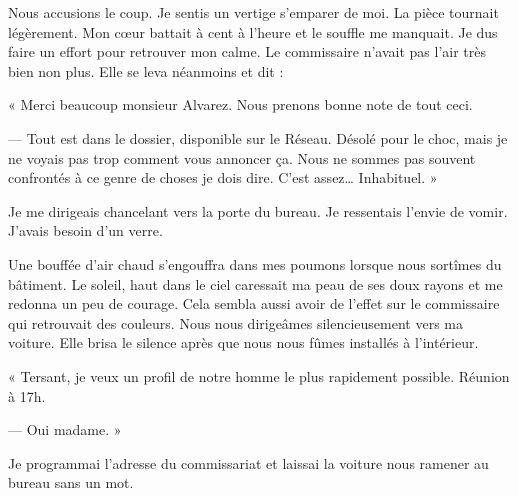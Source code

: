 Nous accusions le coup. Je sentis un vertige s'emparer de moi. La pièce tournait légèrement. Mon cœur battait à cent à 
l'heure et le souffle me manquait. Je dus faire un effort pour retrouver mon calme. Le commissaire n'avait pas l'air 
très bien non plus. Elle se leva néanmoins et dit :

« Merci beaucoup monsieur Alvarez. Nous prenons bonne note de tout ceci.

— Tout est dans le dossier, disponible sur le Réseau. Désolé pour le choc, mais je ne voyais pas trop comment vous 
annoncer ça. Nous ne sommes pas souvent confrontés à ce genre de choses je dois dire. C'est assez… Inhabituel. »

Je me dirigeais chancelant vers la porte du bureau. Je ressentais l'envie de vomir. J'avais besoin d'un verre.

Une bouffée d'air chaud s'engouffra dans mes poumons lorsque nous sortîmes du bâtiment. Le soleil, haut dans le ciel 
caressait ma peau de ses doux rayons et me redonna un peu de courage. Cela sembla aussi avoir de l'effet sur le 
commissaire qui retrouvait des couleurs. Nous nous dirigeâmes silencieusement vers ma voiture. Elle brisa le silence 
après que nous nous fûmes installés à l'intérieur.

« Tersant, je veux un profil de notre homme le plus rapidement possible. Réunion à 17h.

— Oui madame. »

Je programmai l'adresse du commissariat et laissai la voiture nous ramener au bureau sans un mot.